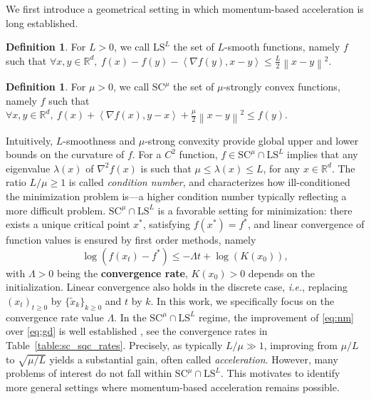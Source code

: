 \documentclass{article}
\def\R{{\mathbb{R}}}
\def\N{{\mathbb{N}}}
\def\xcont{(x_t)_{t\ge 0}}
\def\xdisc{\{\tilde x_k \}_{k\ge 0}}
\def\xgen{\{x_t \}_{t\in \mathcal{K}}}
\newcommand{\norm}[1]{\left\lVert#1\right\rVert}
\newcommand{\dotprod}[1]{\left< #1\right>}
\newcommand{\ls}{\text{LS}^{L}}
\newcommand{\strongconv}{\text{SC}^{\mu}}
\theoremstyle{plain}
\theoremstyle{definition}
\newtheorem{definition}[theorem]{Definition}
\theoremstyle{remark}
\begin{document}
We first introduce a geometrical setting in which momentum-based acceleration is long established.
\begin{definition}
    For $L>0$, we call $\ls$ the set of $L$-smooth functions, namely $f$ such that $\forall x,y\in \R^d,
 ~ f(x)-f(y)-\dotprod{\nabla f(y),x-y}  \le \frac{L}{2}\norm{x-y}^2$.
\end{definition}
\begin{definition}
    For $\mu>0$, we call $\strongconv$ the set of $\mu$-strongly convex functions, namely $f$ such that $\forall x,y \in \R^d,~ f(x)+\dotprod{\nabla f(x),y-x} + \frac{\mu}{2}\norm{x-y}^2 \le f(y).$
\end{definition}
Intuitively, $L$-smoothness and $\mu$-strong convexity provide global upper and lower bounds on the curvature of $f$.
For a $C^2$ function, $f \in\strongconv \cap \ls $ implies that any eigenvalue $\lambda(x)$ of $\nabla^2 f(x)$ is such that $\mu \le \lambda(x) \le L$, for any $x\in\R^d$. The ratio $L/\mu \ge 1 $ is called \textit{condition number}, and characterizes how ill-conditioned the minimization problem is—a higher condition number typically reflecting a more difficult problem. $\strongconv \cap \ls$ is a favorable setting for minimization: there exists a unique critical point $x^\ast$, satisfying $f(x^\ast) = f^\ast$,\hypertarget{cr}{{}} and linear convergence of function values is ensured by first order methods, namely
\[\log (f(x_t)-f^\ast) \le -\Lambda t + \log(K(x_0)), \]
with $\Lambda > 0$ being the \textbf{convergence rate}, $K(x_0) > 0$ depends on the initialization. Linear convergence also holds in the discrete case, \textit{i.e.}, replacing $\xcont$ by $\xdisc$ and $t$ by $k$.
In this work, we specifically focus on the convergence rate value $\Lambda$.
In the $\strongconv \cap \ls$ regime, the improvement of \eqref{eq:nm} over \eqref{eq:gd} is well established \cite{nesterov2004introductory}, see %
the convergence rates in Table~\ref{table:sc_sqc_rates}. Precisely, as typically $L/\mu \gg 1$, improving from $\mu/L$ to $\sqrt{\mu/L}$ yields a substantial gain, often called \textit{acceleration}. However, many problems of interest do not fall within $\strongconv \cap \ls$. This motivates to identify more general settings where momentum-based acceleration remains possible.
\end{document}
